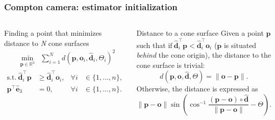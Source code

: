 \documentclass[aspectratio=169]{beamer}
\begin{document}
\begin{frame}[noframenumbering]
\frametitle{Compton camera: estimator initialization}

\begin{columns}[c]

\begin{block}{Finding a point that minimizes distance to \emph{N} cone surfaces}
\begin{align*}
  & \min_{\mathbf{p} \in \mathbb{R}^3} \label{eq:optimization_cost}
  & \sum_{i=1}^{N}d(\mathbf{p}, \mathbf{o}_i, \mathbf{\hat{d}}_i, \Theta_i)^2
\end{align*}\begin{align*}
  \text{s.t.}~ \mathbf{\hat{d}}^{\intercal}_{i}\mathbf{p} &\geq \mathbf{\hat{d}}_i^{\intercal}\mathbf{o}_i, &\forall i &\in \{1, \hdots, n\},\\
  \mathbf{p}^\intercal\mathbf{\hat{e}}_3 &= 0, &\forall i &\in \{1, \hdots, n\}.
\end{align*}
\end{block}


\begin{block}{Distance to a cone surface}
Given a point $\mathbf{p}$ such that $\text{if}\ \mathbf{\hat{d}}^{\intercal}_{i}\mathbf{p} < \mathbf{\hat{d}}_i^{\intercal}\mathbf{o}_i$ ($\mathbf{p}$ is situated \emph{behind} the cone origin), the distance to the cone surface is trivial:
$$
d(\mathbf{p}, \mathbf{o}, \mathbf{\hat{d}}, \Theta) = \|\mathbf{o} - \mathbf{p}\|.
$$
Otherwise, the distance is expressed as
$$
\|\mathbf{p} - \mathbf{o}\| \sin \left( \cos^{-1}\frac{\left(\mathbf{p} - \mathbf{o}\right) \circ \mathbf{\hat{d}}}{\|\mathbf{p} - \mathbf{o}\|} - \Theta\right).
$$
\end{block}

\end{columns}

\end{frame}


\end{document}
